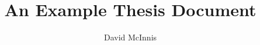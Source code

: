 \documentclass{../ewuthesis}
\begin{document}
\title{An Example Thesis Document}
\author{David McInnis}

\committeewidth{4in}
\approvedwidth{4in}
\comitteespace{\hfill}
\approvedspace{\hfill}



\makesig
\maketitle

\begin{abstract}
  
\end{abstract}


\tableofcontents
\listoffigures
\listoftables
\listofappendices

\begin{acknowledgements}
  
\end{acknowledgements}

\begin{quotepage}
  
\end{quotepage}




\nocite{wikibook}



\appendix

\end{document}
